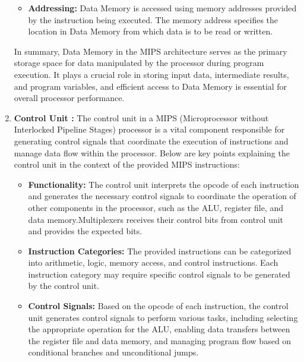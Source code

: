 \documentclass{article}
\begin{document}
\begin{enumerate}
\begin{itemize}
				\item \textbf{Addressing:} Data Memory is accessed using memory addresses provided by the instruction being executed. The memory address specifies the location in Data Memory from which data is to be read or written.
				
				
				
				
			\end{itemize}
			
			In summary, Data Memory in the MIPS architecture serves as the primary storage space for data manipulated by the processor during program execution. It plays a crucial role in storing input data, intermediate results, and program variables, and efficient access to Data Memory is essential for overall processor performance.
			
			
			\item \textbf{Control Unit : }
			The control unit in a MIPS (Microprocessor without Interlocked Pipeline Stages) processor is a vital component responsible for generating control signals that coordinate the execution of instructions and manage data flow within the processor. Below are key points explaining the control unit in the context of the provided MIPS instructions:
			
			\begin{itemize}
				
				\item \textbf{Functionality:} The control unit interprets the opcode of each instruction and generates the necessary control signals to coordinate the operation of other components in the processor, such as the ALU, register file, and data memory.Multiplexers receives their control bits from control unit and provides the expected bits.
				
				\item \textbf{Instruction Categories:} The provided instructions can be categorized into arithmetic, logic, memory access, and control instructions. Each instruction category may require specific control signals to be generated by the control unit.
				
				\item \textbf{Control Signals:} Based on the opcode of each instruction, the control unit generates control signals to perform various tasks, including selecting the appropriate operation for the ALU, enabling data transfers between the register file and data memory, and managing program flow based on conditional branches and unconditional jumps.
				

\end{itemize}
\end{enumerate}
\end{document}
